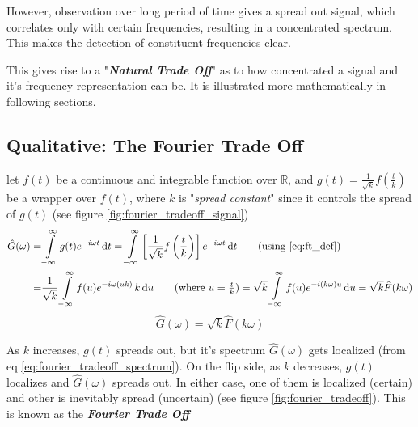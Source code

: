 \documentclass[11pt, a4paper]{article}
\newcommand{\eqrefnp}[1]{\textup{\ref{#1}}}
\newcommand{\diff}{\mathop{}\!\mathrm{d}}
\newcommand{\du}{\diff u}
\newcommand{\dt}{\diff t}
\newcommand{\dint}[2]{\int \limits_{#1}^{#2}}  %
\newcommand{\intinfty}{\dint{-\infty}{\infty}}	%
\begin{document}
However, observation over long period of time gives a spread out signal, which correlates only with certain frequencies, resulting in a concentrated spectrum. This makes the detection of constituent frequencies clear.

This gives rise to a "\textbf{\textit{Natural Trade Off}}" as to how concentrated a signal and it's frequency representation can be. It is illustrated more mathematically in following sections.

\subsection{Qualitative: The Fourier Trade Off}\label{sec:fourier_uncertainity_principle_qualitative}
let $f(t)$ be a continuous and integrable function over $\mathbb{R}$, and $g(t) = \frac{1}{\sqrt{k}} f \left( \frac{t}{k} \right)$ be a wrapper over $f(t)$, where $k$ is "\textit{spread constant}" since it controls the spread of $g(t)$ (see figure \ref{fig:fourier_tradeoff_signal}) \cite{dubey2021fourieruncertainity}
\begin{align*}
	\hat{G}(\omega) = & \intinfty g(t) e^{-i \omega t} \dt
	= \intinfty \left[ \frac{1}{\sqrt{k}} f \left( \frac{t}{k} \right) \right] e^{-i \omega t} \dt  \tag{using \eqrefnp{eq:ft_def}} \\
	= & \frac{1}{\sqrt{k}} \intinfty f(u) e^{-i \omega (uk)} \, k \du  \tag{where $u = \frac{t}{k}$} 
	= \sqrt{k} \intinfty f(u) e^{-i (k \omega) u} \du = \sqrt{k} \hat{F}(k \omega) 
\end{align*}
\begin{equation}\label{eq:fourier_tradeoff_spectrum}
	\boxed{
		\hat{G}(\omega) = \sqrt{k} \hat{F}(k \omega)
	}
\end{equation}

 As $k$ increases, $g(t)$ spreads out, but it's spectrum $\hat{G}(\omega)$ gets localized (from eq \eqrefnp{eq:fourier_tradeoff_spectrum}). On the flip side, as $k$ decreases, $g(t)$ localizes and $\hat{G}(\omega)$ spreads out. In either case, one of them is localized (certain) and other is inevitably spread (uncertain) (see figure \ref{fig:fourier_tradeoff}). This is known as the \textbf{\textit{Fourier Trade Off}}
 
\end{document}
